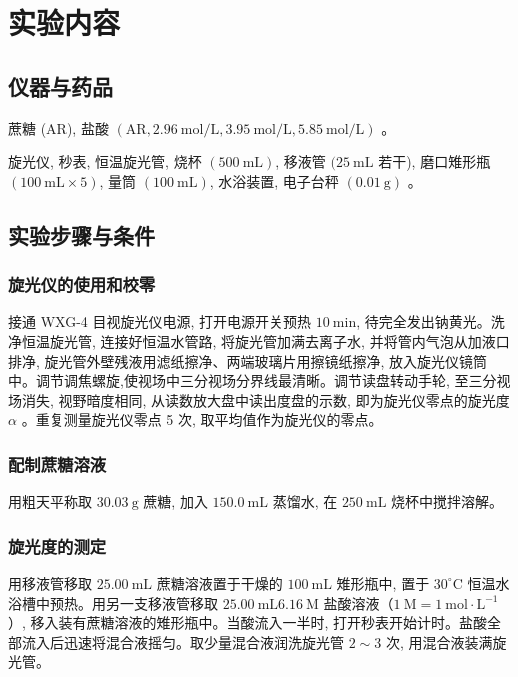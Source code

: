\section{实验内容\cite{pcl2002}}

\subsection{仪器与药品}

蔗糖 (AR), 盐酸 $(\mathrm{AR}, 2.96 \mathrm{~mol} / \mathrm{L}, 3.95 \mathrm{~mol} / \mathrm{L}, 5.85 \mathrm{~mol} / \mathrm{L})$ 。

旋光仪, 秒表, 恒温旋光管, 烧杯 $(500 \mathrm{~mL})$, 移液管 $(25 \mathrm{~mL}$ 若干), 磨口雉形瓶 $(100 \mathrm{~mL} \times 5)$, 量筒 $(100 \mathrm{~mL})$, 水浴装置, 电子台秤 $(0.01 \mathrm{~g})$ 。

\subsection{实验步骤与条件}

\subsubsection{旋光仪的使用和校零}

接通 WXG-4 目视旋光仪电源, 打开电源开关预热 $10 \mathrm{~min}$, 待完全发出钠黄光。洗净恒温旋光管, 连接好恒温水管路, 将旋光管加满去离子水, 并将管内气泡从加液口排净, 旋光管外壁残液用滤纸擦净、两端玻璃片用擦镜纸擦净, 放入旋光仪镜筒中。调节调焦螺旋,使视场中三分视场分界线最清晰。调节读盘转动手轮, 至三分视场消失, 视野暗度相同, 从读数放大盘中读出度盘的示数, 即为旋光仪零点的旋光度 $\alpha$ 。重复测量旋光仪零点 5 次, 取平均值作为旋光仪的零点。

\subsubsection{配制蔗糖溶液}

用粗天平称取 $30.03 \mathrm{~g}$ 蔗糖, 加入 $150.0 \mathrm{~mL}$ 蒸馏水, 在 $250 \mathrm{~mL}$ 烧杯中搅拌溶解。

\subsubsection{旋光度的测定}

用移液管移取 $25.00 \mathrm{~mL}$ 蔗糖溶液置于干燥的 $100 \mathrm{~mL}$ 雉形瓶中, 置于 $30^{\circ} \mathrm{C}$ 恒温水浴槽中预热。用另一支移液管移取 $25.00 \mathrm{~mL} 6.16 \mathrm{~M}$ 盐酸溶液（$1\mathrm{~M}=1\mathrm{~mol\cdot L^{-1}}$）, 移入装有蔗糖溶液的雉形瓶中。当酸流入一半时, 打开秒表开始计时。盐酸全部流入后迅速将混合液摇匀。取少量混合液润洗旋光管 $2 \sim 3$ 次, 用混合液装满旋光管。

